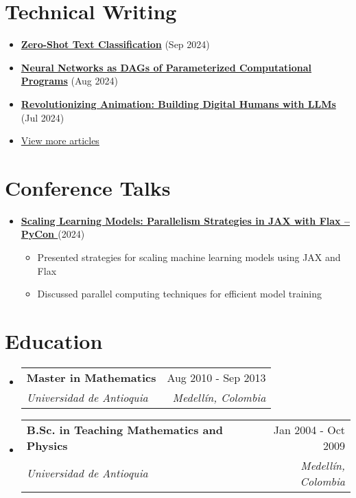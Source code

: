 \documentclass[letterpaper,11pt]{article}
\makeatletter
\newcommand{\resumeSubheading}[4]{
  \vspace{-2pt}
  \item[]
  \begin{tabular*}{\textwidth}{@{\extracolsep{\fill}}l r}
    \textbf{#1} & #2 \\
    \textit{#3} & \textit{#4} \\
  \end{tabular*}
  \vspace{-5pt}
}
\newcommand{\normalfaExternalLink}{{\mdseries\faExternalLink}}
\newcommand{\normalfaYoutube}{{\mdseries\faYoutube}}
\makeatother
\begin{document}
\section{Technical Writing}
\begin{itemize}[leftmargin=*, itemsep=0pt]
    \item \textbf{\href{https://www.asanchezyali.com/blog/en/ai/20240917ZeroShot}{Zero-Shot Text Classification}} (Sep 2024)
    \item \textbf{\href{https://www.asanchezyali.com/blog/en/differentiable-programming/20240923DifferentiablePrograms}{Neural Networks as DAGs of Parameterized Computational Programs}} (Aug 2024)
    \item \textbf{\href{https://www.asanchezyali.com/blog/en/ai-avatars/20240703DigitalHuman}{Revolutionizing Animation: Building Digital Humans with LLMs}} (Jul 2024)
    \item \href{https://www.asanchezyali.com/}{View more articles \normalfaExternalLink}
\end{itemize}

\section{Conference Talks}
\begin{itemize}[leftmargin=*]
    \item \textbf{\href{https://www.youtube.com/watch?v=m4hP1soE414}{Scaling Learning Models: Parallelism Strategies in JAX with Flax -- PyCon \normalfaYoutube}} (2024)
    \begin{itemize}[itemsep=0pt]
        \item Presented strategies for scaling machine learning models using JAX and Flax
        \item Discussed parallel computing techniques for efficient model training
    \end{itemize}
\end{itemize}

\section{Education}
\begin{itemize}[leftmargin=0pt, itemindent=0pt, label={}]
\resumeSubheading
{Master in Mathematics}{Aug 2010 - Sep 2013}
{Universidad de Antioquia}{Medellín, Colombia}

\resumeSubheading
{B.Sc. in Teaching Mathematics and Physics}{Jan 2004 - Oct 2009}
{Universidad de Antioquia}{Medellín, Colombia}
\end{itemize}
\end{document}
